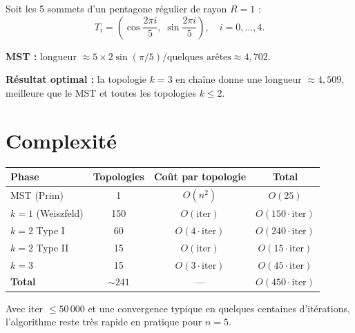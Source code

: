 \documentclass[12pt, a4paper]{article}
\begin{document}
Soit les 5 sommets d'un pentagone régulier de rayon $R = 1$ :
\[
    T_i = \left(\cos\frac{2\pi i}{5},\; \sin\frac{2\pi i}{5}\right), \quad i = 0, \ldots, 4.
\]

\textbf{MST :} longueur $\approx 5 \times 2\sin(\pi/5) / \text{quelques arêtes}
\approx 4{,}702$.

\textbf{Résultat optimal :} la topologie $k = 3$ en chaîne donne une longueur
$\approx 4{,}509$, meilleure que le MST et toutes les topologies $k \leq 2$.

\section{Complexité}

\begin{center}
\begin{tabular}{lccc}
\toprule
\textbf{Phase} & \textbf{Topologies} & \textbf{Coût par topologie} & \textbf{Total} \\
\midrule
MST (Prim)           & 1   & $O(n^2)$              & $O(25)$ \\
$k=1$ (Weiszfeld)    & 150 & $O(\text{iter})$      & $O(150 \cdot \text{iter})$ \\
$k=2$ Type I         & 60  & $O(4 \cdot \text{iter})$ & $O(240 \cdot \text{iter})$ \\
$k=2$ Type II        & 15  & $O(\text{iter})$      & $O(15 \cdot \text{iter})$ \\
$k=3$                & 15  & $O(3 \cdot \text{iter})$ & $O(45 \cdot \text{iter})$ \\
\midrule
\textbf{Total}       & $\sim\!241$ & — & $O(450 \cdot \text{iter})$ \\
\bottomrule
\end{tabular}
\end{center}

\medskip

Avec iter $\leq 50\,000$ et une convergence typique en quelques centaines d'itérations,
l'algorithme reste très rapide en pratique pour $n = 5$.
\end{document}
